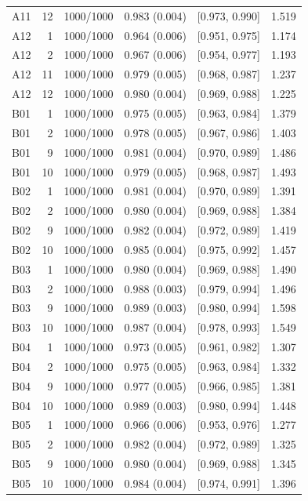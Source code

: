 \begin{longtable}[t]{lrllll}
A11 & 12 & 1000/1000 & 0.983 (0.004) & {}[0.973, 0.990] & 1.519\\
A12 & 1 & 1000/1000 & 0.964 (0.006) & {}[0.951, 0.975] & 1.174\\
A12 & 2 & 1000/1000 & 0.967 (0.006) & {}[0.954, 0.977] & 1.193\\
A12 & 11 & 1000/1000 & 0.979 (0.005) & {}[0.968, 0.987] & 1.237\\
A12 & 12 & 1000/1000 & 0.980 (0.004) & {}[0.969, 0.988] & 1.225\\
B01 & 1 & 1000/1000 & 0.975 (0.005) & {}[0.963, 0.984] & 1.379\\
B01 & 2 & 1000/1000 & 0.978 (0.005) & {}[0.967, 0.986] & 1.403\\
B01 & 9 & 1000/1000 & 0.981 (0.004) & {}[0.970, 0.989] & 1.486\\
B01 & 10 & 1000/1000 & 0.979 (0.005) & {}[0.968, 0.987] & 1.493\\
B02 & 1 & 1000/1000 & 0.981 (0.004) & {}[0.970, 0.989] & 1.391\\
B02 & 2 & 1000/1000 & 0.980 (0.004) & {}[0.969, 0.988] & 1.384\\
B02 & 9 & 1000/1000 & 0.982 (0.004) & {}[0.972, 0.989] & 1.419\\
B02 & 10 & 1000/1000 & 0.985 (0.004) & {}[0.975, 0.992] & 1.457\\
B03 & 1 & 1000/1000 & 0.980 (0.004) & {}[0.969, 0.988] & 1.490\\
B03 & 2 & 1000/1000 & 0.988 (0.003) & {}[0.979, 0.994] & 1.496\\
B03 & 9 & 1000/1000 & 0.989 (0.003) & {}[0.980, 0.994] & 1.598\\
B03 & 10 & 1000/1000 & 0.987 (0.004) & {}[0.978, 0.993] & 1.549\\
B04 & 1 & 1000/1000 & 0.973 (0.005) & {}[0.961, 0.982] & 1.307\\
B04 & 2 & 1000/1000 & 0.975 (0.005) & {}[0.963, 0.984] & 1.332\\
B04 & 9 & 1000/1000 & 0.977 (0.005) & {}[0.966, 0.985] & 1.381\\
B04 & 10 & 1000/1000 & 0.989 (0.003) & {}[0.980, 0.994] & 1.448\\
B05 & 1 & 1000/1000 & 0.966 (0.006) & {}[0.953, 0.976] & 1.277\\
B05 & 2 & 1000/1000 & 0.982 (0.004) & {}[0.972, 0.989] & 1.325\\
B05 & 9 & 1000/1000 & 0.980 (0.004) & {}[0.969, 0.988] & 1.345\\
B05 & 10 & 1000/1000 & 0.984 (0.004) & {}[0.974, 0.991] & 1.396\\

\end{longtable}
